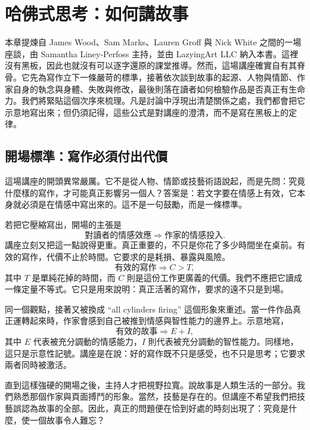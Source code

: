 \chapter{哈佛式思考：如何講故事}

本章提煉自 James Wood、Sam Marks、Lauren Groff 與 Nick White 之間的一場座談，由 Samantha Liney-Perfoss 主持，並由 LazyingArt LLC 納入本書。這裡沒有黑板，因此也就沒有可以逐字還原的課堂推導。然而，這場講座確實自有其脊骨。它先為寫作立下一條嚴苛的標準，接著依次談到故事的起源、人物與情節、作家自身的執念與身體、失敗與修改，最後則落在讀者如何檢驗作品是否真正有生命力。我們將緊貼這個次序來梳理。凡是討論中浮現出清楚關係之處，我們都會把它示意地寫出來；但仍須記得，這些公式是對講座的澄清，而不是寫在黑板上的定律。

\section{開場標準：寫作必須付出代價}

這場講座的開頭異常嚴厲。它不是從人物、情節或技藝術語說起，而是先問：究竟什麼樣的寫作，才可能真正影響另一個人？答案是：若文字要在情感上有效，它本身就必須是在情感中寫出來的。這不是一句鼓勵，而是一條標準。

若把它壓縮寫出，開場的主張是
\begin{equation}
\text{對讀者的情感效應} \Rightarrow \text{作家的情感投入}.
\end{equation}
講座立刻又把這一點說得更重。真正重要的，不只是你花了多少時間坐在桌前。有效的寫作，代價不止於時間。它要求的是耗損、暴露與風險。
\begin{equation}
\text{有效的寫作} \Rightarrow C > T,
\end{equation}
其中 \(T\) 是單純花掉的時間，而 \(C\) 則是這份工作更廣義的代價。我們不應把它讀成一條定量不等式。它只是用來說明：真正活著的寫作，要求的遠不只是到場。

同一個觀點，接著又被換成 ``all cylinders firing'' 這個形象來重述。當一件作品真正運轉起來時，作家會感到自己被推到情感與智性能力的邊界上。示意地寫，
\begin{equation}
\text{有效的故事} \Rightarrow E + I,
\end{equation}
其中 \(E\) 代表被充分調動的情感能力，\(I\) 則代表被充分調動的智性能力。同樣地，這只是示意性記號。講座是在說：好的寫作既不只是感受，也不只是思考；它要求兩者同時被激活。

直到這樣強硬的開場之後，主持人才把視野拉寬。說故事是人類生活的一部分。我們熟悉那個作家與頁面搏鬥的形象。當然，技藝是存在的。但講座不希望我們把技藝誤認為故事的全部。因此，真正的問題便在恰到好處的時刻出現了：究竟是什麼，使一個故事令人難忘？

